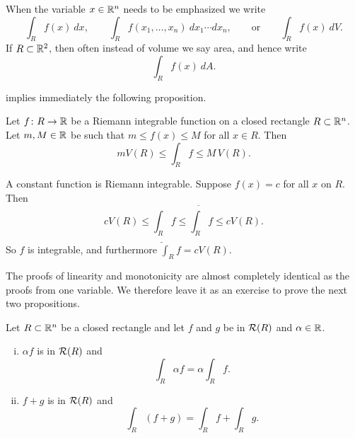 When the variable $x \in {\mathbb{R}}^n$ needs to be emphasized we write
\begin{equation*}
\int_R f(x)~dx,
\qquad
\int_R f(x_1,\ldots,x_n)~dx_1 \cdots dx_n,
\qquad
\text{or}
\qquad
\int_R f(x)~dV .
\end{equation*}
If $R \subset {\mathbb{R}}^2$, then often instead of volume we say area, and hence
write
\begin{equation*}
\int_R f(x)~dA .
\end{equation*}

 implies immediately the following
proposition.

\begin{prop} \label{mv:intbound:prop}
Let $f \colon R \to {\mathbb{R}}$ be a Riemann integrable function
on a closed rectangle $R \subset {\mathbb{R}}^n$.
Let $m, M \in {\mathbb{R}}$ be 
such that $m \leq f(x) \leq M$ for all $x \in R$.  Then
\begin{equation*}
m V(R) \leq
\int_{R} f
\leq M \, V(R) .
\end{equation*}
\end{prop}

\begin{example}
A constant function is Riemann integrable.  Suppose
$f(x) = c$ for all $x$ on $R$.  Then
\begin{equation*}
c V(R) \leq \underline{\int_R} f \leq \overline{\int_R} f \leq cV(R) .
\end{equation*}
So $f$ is integrable, and furthermore $\int_R f = cV(R)$.
\end{example}

The proofs of linearity and monotonicity are almost completely identical as
the proofs from one variable.  We therefore leave it as an exercise to prove
the next two propositions.

\begin{samepage}
\begin{prop}[Linearity] \label{mv:intlinearity:prop}
Let $R \subset {\mathbb{R}}^n$ be a closed rectangle and let
$f$ and $g$ be in ${\mathcal{R}}(R)$ and $\alpha \in {\mathbb{R}}$.
\begin{enumerate}[(i)]
\item $\alpha f$ is in ${\mathcal{R}}(R)$ and
\begin{equation*}
\int_R \alpha f = \alpha \int_R f .
\end{equation*}
\item $f+g$ is in ${\mathcal{R}}(R)$ and
\begin{equation*}
\int_R (f+g) = 
\int_R f
+
\int_R g .
\end{equation*}
\end{enumerate}
\end{prop}
\end{samepage}

